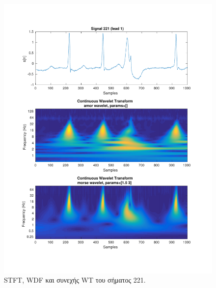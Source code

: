 \documentclass[11pt,a4paper]{article}
\begin{document}
\begin{figure}[H]
\begin{minipage}{0.48\textwidth}
	\includegraphics[width=\textwidth]{fig/221l1_cwt.pdf}
\end{minipage}
\vfill
\caption{STFT, WDF και συνεχής WT του σήματος 221.}
\label{fig:221l1_stft_wdf_wt}
\end{figure}
\end{document}

